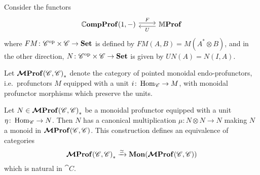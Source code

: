 \documentclass[12pt,oneside,article,draft]{memoir}
\begin{document}
Consider the functors
\begin{equation}\label{eqn:functors 1C CC}
\begin{tikzcd}
   \dCompProf(1,-) \ar[r,shift left,"F"]
   & \dMProf \ar[l,shift left,"U"]
\end{tikzcd}
\end{equation}
where $FM\colon{\mathscr{C}}^{\text{op}}\times\mathscr{C}\to\mathbf{Set}$ is defined by $FM(A,B)=M(A^*\otimes B)$, and in the other direction, $N\colon{\mathscr{C}}^{\text{op}}\times\mathscr{C}\to\mathbf{Set}$ is given by $UN(A)=N(I,A)$.

Let $\bm{\mathcal{M}}\mathbf{Prof}{(\mathscr{C},\mathscr{C})}_{\ast}$ denote the category of pointed monoidal endo-profunctors, i.e.~profunctors $M$ equipped with a unit $i\colon\operatorname{Hom}_{\mathscr{C}}\to M$, with monoidal profunctor morphisms which preserve the units.

\begin{proposition}\label{Prop:unit implies monoid}
   Let $N\in\bm{\mathcal{M}}\mathbf{Prof}{(\mathscr{C},\mathscr{C})}_*$ be a monoidal profunctor equipped with a unit $\eta\colon\operatorname{Hom}_{\mathscr{C}}\to N$.
   Then $N$ has a canonical multiplication $\mu\colon N\otimes N\to N$ making $N$ a monoid in $\bm{\mathcal{M}}\mathbf{Prof}(\mathscr{C},\mathscr{C})$.
   This construction defines an equivalence of categories
      \[\bm{\mathcal{M}}\mathbf{Prof}{(\mathscr{C},\mathscr{C})}_*\xrightarrow{\simeq}\mathbf{Mon}(\bm{\mathcal{M}}\mathbf{Prof}(\mathscr{C},\mathscr{C}))\]
   which is natural in $\cat{C}$.
\end{proposition}
\end{document}
